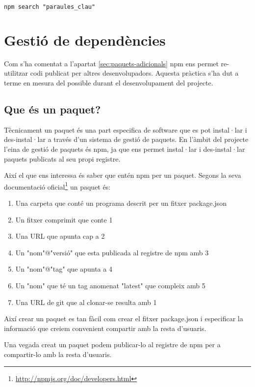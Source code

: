 \begin{verbatim}
npm search "paraules_clau"
\end{verbatim}

\section{Gestió de dependències}
\label{sec:gestio-dependencies}
Com s'ha comentat a l'apartat \ref{sec:paquets-adicionals} npm ens permet re-utilitzar codi publicat per altres desenvolupadors. Aquesta pràctica s'ha dut a terme en mesura del possible durant el desenvolupament del projecte.  

\subsection{Que és un paquet?}
\label{sec:que-es-un-paquet}

Tècnicament un paquet és una part especifica de software que es pot instal·lar i des-instal·lar a través d'un sistema de gestió de paquets. En l'àmbit del projecte l'eina de gestió de paquets és npm, ja que ens permet instal·lar i des-instal·lar paquets publicats al seu propi registre. 

Així el que ens interessa és saber que entén npm per un paquet. Segons la seva documentació oficial\footnote{\url{http://npmjs.org/doc/developers.html}} un paquet és: 

\begin{enumerate}
\item {Una carpeta que conté un programa descrit per un fitxer package.json}
\item {Un fitxer comprimit que conte 1}
\item {Una URL que apunta cap a 2}
\item {Un "nom"@"versió" que esta publicada al registre de npm amb 3}
\item {Un "nom"@"tag" que apunta a 4}
\item {Un "nom" que té un tag anomenat "latest" que compleix amb 5}
\item {Una URL de git que al clonar-se resulta amb 1}
\end{enumerate}

Així crear un paquet es tan fàcil com crear el fitxer package.json i especificar la informació que creiem convenient compartir amb la resta d'usuaris. 

Una vegada creat un paquet podem publicar-lo al registre de npm per a compartir-lo amb la resta d'usuaris. 

